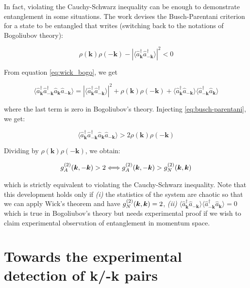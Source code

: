 In fact, violating the Cauchy-Schwarz inequality can be enough to demonstrate entanglement in some situations. The work \cite{busch2014quantum} devises the Busch-Parentani criterion for a state to be entangled that writes (switching back to the notations of Bogoliubov theory):

\begin{equation}
    \rho(\bm{k}) \rho(-\bm{k}) - | \langle \hat{a}^{\dagger}_{\bm k} \hat{a}^{\dagger}_{-\bm {k}} \rangle |^2 < 0
    \label{eq:busch-parentani}
\end{equation}

\noindent From equation \ref{eq:wick_bogo}, we get

\begin{equation}
    \langle \hat{a}^{\dagger}_{\bm{k}} \hat{a}^{\dagger}_{-\bm k} \hat{a}_{\bm k} \hat{a}_{-\bm {k}} \rangle = | \langle \hat{a}^{\dagger}_{\bm k} \hat{a}^{\dagger}_{-\bm {k}} \rangle |^2 + \rho(\bm{k}) \rho(-\bm{k}) + \langle \hat{a}^{\dagger}_{\bm k} \hat{a}_{-\bm {k}} \rangle \langle \hat{a}^{\dagger}_{-\bm {k}} \hat{a}_{\bm k} \rangle
\end{equation}

\noindent where the last term is zero in Bogoliubov's theory. Injecting \ref{eq:busch-parentani}, we get:

\begin{equation}
    \langle \hat{a}^{\dagger}_{\bm{k}} \hat{a}^{\dagger}_{-\bm k} \hat{a}_{\bm k} \hat{a}_{-\bm {k}} \rangle > 2 \rho(\bm{k}) \rho(-\bm{k})
\end{equation}

\noindent Dividing by  $\rho(\bm{k}) \rho(-\bm{k})$, we obtain:

\begin{equation}
    g^{(2)}_A (\bm{k},-\bm{k}) > 2 \Longleftrightarrow g^{(2)}_A (\bm{k},-\bm{k}) > g^{(2)}_N (\bm{k},\bm{k})
\end{equation}

\noindent which is strictly equivalent to violating the Cauchy-Schwarz inequality. Note that this development holds only if \textit{(i)} the statistics of the system are chaotic so that we can apply Wick's theorem and have $g^{(2)}_N (\bm{k},\bm{k})=2$, \textit{(ii)} $\langle \hat{a}^{\dagger}_{\bm k} \hat{a}_{-\bm {k}} \rangle \langle \hat{a}^{\dagger}_{-\bm {k}} \hat{a}_{\bm k} \rangle=0$ which is true in Bogoliubov's theory but needs experimental proof if we wish to claim experimental observation of entanglement in momentum space.
  

\section{Towards the experimental detection of k/-k pairs}

